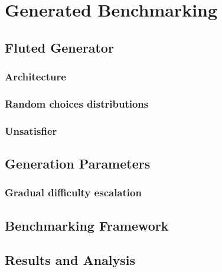 \chapter{Generated Benchmarking}\label{chap:generated-benchmarking}
  \section{Fluted Generator}
    \subsection{Architecture}
    \subsection{Random choices distributions}
    \subsection{Unsatisfier}
  \section{Generation Parameters}
    \subsection{Gradual difficulty escalation}
  \section{Benchmarking Framework}
  \section{Results and Analysis}
  



